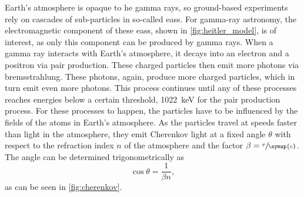 Earth's atmosphere is opaque to \gls{he} gamma rays, so ground-based experiments rely on
cascades of sub-particles in so-called \glspl{eas}. For gamma-ray astronomy, the electromagnetic
component of these \glspl{eas}, shown in \autoref{fig:heitler_model}, is of interest, as only this
component can be produced by gamma rays. When a gamma ray interacts with Earth's atmosphere, it decays into an
electron and a positron via pair production. These charged particles then emit more photons via
bremsstrahlung. These photons, again, produce more charged particles, which in turn emit even more
photons. This process continues until any of these processes reaches energies below a certain
threshold, \ie \SI{1022}{\kilo\eV} for the pair production process. For these processes to happen,
the particles have to be influenced by the fields of the atoms in Earth's atmosphere. As the particles
travel at speeds faster than light in the atmosphere, they emit Cherenkov light at
a fixed angle \(\theta\) with respect to the refraction index \(n\) of the atmosphere and the
factor \(\beta = \sfrac{v}{\symup{c}}\). The angle can be determined trigonometrically as
\begin{equation}
    \cos\theta = \frac{1}{\beta n},
\end{equation}
as can be seen in \autoref{fig:cherenkov}.

